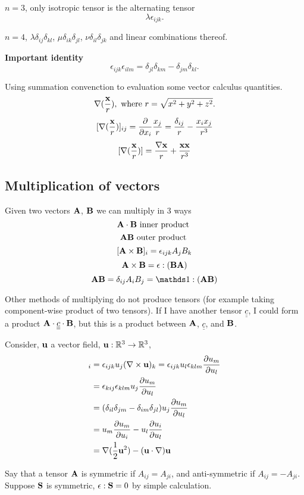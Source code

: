 \documentclass[12pt]{article}
\newcommand{\xx}{{\bf x}}
\newcommand{\uu}{{\bf u}}
\newcommand{\bA}{{\bf A}}
\newcommand{\bB}{{\bf B}}
\newcommand{\bS}{{\bf S}}
\newcommand{\bnabla}{{\bf \nabla}}
\newcommand{\cc}{{\underline{\underline c}}}
\newcommand{\RR}{{\mathbb R}}
\begin{document}
$n=3$, only isotropic tensor is the alternating tensor
\[
\lambda\epsilon_{ijk}.
\]

$n=4$, $\lambda\delta_{ij}\delta_{kl}$,  $\mu\delta_{ik}\delta_{jl}$,  $\nu\delta_{il}\delta_{jk}$ and linear combinations thereof.

\bigskip
\bigskip

{\bf Important identity}
\[
\epsilon_{ijk}\epsilon_{ilm} = \delta_{jl}\delta_{km} - \delta_{jm}\delta_{kl}.
\]

Using summation convenction to evaluation some vector calculus quantities.
\[
\bnabla(\frac{\xx}{r}), \text{ where } r = \sqrt{x^2 + y^2 + z^2}.
\]
\[
[\bnabla(\frac{\xx}{r})]_{ij}= \frac{\partial}{\partial x_i}\frac{x_j}{r} = \frac{\delta_{ij}}{r} - \frac{x_ix_j}{r^3}
\]
\[
[\bnabla(\frac{\xx}{r})] = \frac{\bnabla \xx}{r} + \frac{\xx\xx}{r^3}
\]

\subsection{Multiplication of vectors}
Given two vectors $\bA$, $\bB$ we can multiply in 3 ways
\[
\bA \cdot\bB \text{ inner product }
\]
\[ 
\bA\bB \text{ outer product }
\]
\[
[\bA\times\bB]_i = \epsilon_{ijk}A_jB_k
\]
\[
\bA\times\bB = \epsilon:(\bB\bA)
\]
\[
\bA\bB = \delta_{ij}A_iB_j = {\mathds 1}:(\bA\bB)
\]

Other methods of multiplying do not produce tensors (for example taking component-wise product of two tensors).
If I have another tensor $\cc$, I could form a product $\bA\cdot\cc\cdot\bB$, but this is a product between $\bA$, $\cc$, and $\bB$.

Consider, $\uu$ a vector field, $\uu: \RR^3 \to\RR^3$,
\begin{align*}
[\uu\times(\nabla\times\uu)]_i &= \epsilon_{ijk}u_j(\nabla\times\uu)_k = \epsilon_{ijk}u_l\epsilon_{klm}\frac{\partial u_m}{\partial u_l}\\
&=  \epsilon_{kij}\epsilon_{klm} u_j\frac{\partial u_m}{\partial u_l}\\
&=(\delta_{il}\delta_{jm} - \delta_{im}\delta_{jl})u_j\frac{\partial u_m}{\partial u_l}\\
&=u_m\frac{\partial u_m}{\partial u_i} - u_l\frac{\partial u_i}{\partial u_l}\\
&=\bnabla (\frac 1 2 \uu^2) - (\uu\cdot\bnabla)\uu
\end{align*}

Say that a tensor $\bA$ is symmetric if $A_{ij} = A_{ji}$, and anti-symmetric if $A_{ij} =- A_{ji}$. Suppose $\bS$ is symmetric, $\epsilon:\bS = 0$ by simple calculation.
\end{document}
